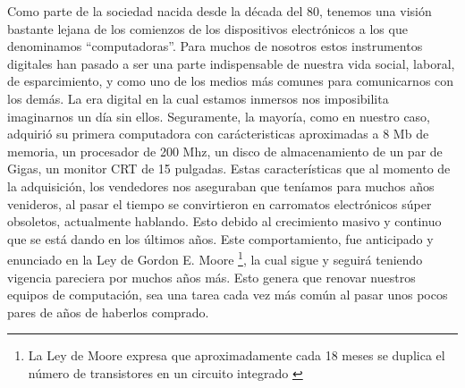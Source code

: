 \documentclass[%
 	final,
%
	notitlepage,
	narroweqnarray,
	inline,
 	twoside,
	]{ieee}
\begin{document}
Como parte de la sociedad nacida desde la d\'ecada del 80, tenemos una visi\'on bastante lejana de los comienzos de los dispositivos electr\'onicos a los que denominamos “computadoras”. Para muchos de nosotros estos instrumentos digitales han pasado a ser una parte indispensable de nuestra vida social, laboral, de esparcimiento, y como uno de los medios m\'as comunes para comunicarnos con los dem\'as. La era digital en la cual estamos inmersos nos imposibilita imaginarnos un d\'ia sin ellos. 
Seguramente, la mayor\'ia, como en nuestro caso, adquiri\'o su primera computadora con car\'acteristicas aproximadas a 8 Mb de memoria, un procesador de 200 Mhz, un disco de almacenamiento de un par de Gigas, un monitor CRT de 15 pulgadas. Estas caracter\'isticas que al momento de la adquisici\'on, los vendedores nos aseguraban que ten\'iamos para muchos a\~nos venideros, al pasar el tiempo se convirtieron en carromatos electr\'onicos s\'uper obsoletos, actualmente hablando. Esto debido al crecimiento masivo y continuo que se est\'a dando en los \'ultimos a\~nos.
Este comportamiento, fue anticipado y enunciado en la Ley de Gordon E. Moore \footnote{La Ley de Moore expresa que aproximadamente cada 18 meses se duplica el n\'umero de transistores en un circuito integrado \cite{LeyMoore}}, la cual sigue y seguir\'a teniendo vigencia pareciera por muchos a\~nos m\'as. Esto genera que renovar nuestros equipos de computaci\'on, sea una tarea cada vez m\'as com\'un al pasar unos pocos pares de a\~nos de haberlos comprado.
\end{document}
